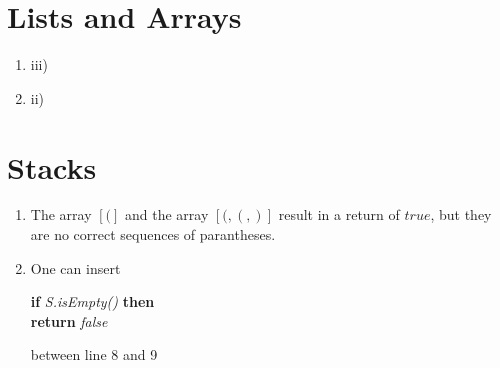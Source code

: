 \documentclass[sectionformat = exercise]{gadsescript}
\begin{document}
\maketitle
\section{Lists and Arrays}
\begin{enumerate}[label=\alph*)]
	\item iii)
	\item ii)
\end{enumerate}

\section{Stacks}
\begin{enumerate}[label=\alph*)]
	\item The array $[(]$ and the array $[(, (, )]$ result in a return of $true$, but they are no correct sequences of parantheses.
	\item One can insert
		\begin{algorithm*}
			\textbf{if} \textit{S.isEmpty()} \textbf{then}\\
			\quad \textbf{return} \textit{false}
		\end{algorithm*}
		between line 8 and 9
\end{enumerate}
\end{document}
